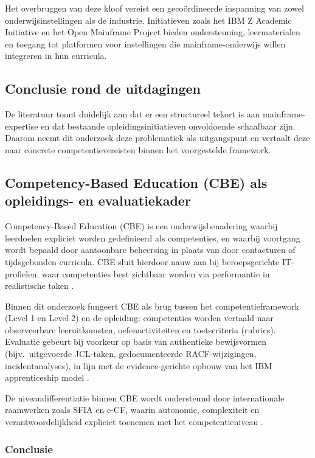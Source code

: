 Het overbruggen van deze kloof vereist een gecoördineerde inspanning van zowel onderwijsinstellingen als de industrie. Initiatieven zoals het IBM Z Academic Initiative en het Open Mainframe Project bieden ondersteuning, leermaterialen en toegang tot platformen voor instellingen die mainframe-onderwijs willen integreren in hun curricula.

\subsection{Conclusie rond de uitdagingen}
\label{sec:uitdagingen-standvanzaken-conclusie}
De literatuur toont duidelijk aan dat er een structureel tekort is aan mainframe-expertise en dat bestaande opleidingsinitiatieven onvoldoende schaalbaar zijn.
Daarom neemt dit onderzoek deze problematiek als uitgangspunt en vertaalt deze naar concrete competentievereisten
binnen het voorgestelde framework.

\subsection{Competency-Based Education (CBE) als opleidings- en evaluatiekader}
\label{sec:cbe}

Competency-Based Education (CBE) is een onderwijsbenadering waarbij leerdoelen expliciet worden gedefinieerd als competenties, en waarbij voortgang wordt bepaald door aantoonbare beheersing in plaats van door contacturen of tijdsgebonden curricula. CBE sluit hierdoor nauw aan bij beroepsgerichte IT-profielen, waar competenties best zichtbaar worden via performantie in realistische taken \autocite{mulder2014competence}. 

Binnen dit onderzoek fungeert CBE als brug tussen het competentieframework (Level 1 en Level 2) en de opleiding: competenties worden vertaald naar observeerbare leeruitkomsten, oefenactiviteiten en toetscriteria (rubrics). Evaluatie gebeurt bij voorkeur op basis van authentieke bewijsvormen (bijv.\ uitgevoerde JCL-taken, gedocumenteerde RACF-wijzigingen, incidentanalyses), in lijn met de evidence-gerichte opbouw van het IBM apprenticeship model \autocite{ibm_level1_framework,ibm_level2_framework}. 

De niveaudifferentiatie binnen CBE wordt ondersteund door internationale raamwerken zoals SFIA en e-CF, waarin autonomie, complexiteit en verantwoordelijkheid expliciet toenemen met het competentieniveau \autocite{sfia_framework,eCF_framework}.

\subsubsection{Conclusie}

